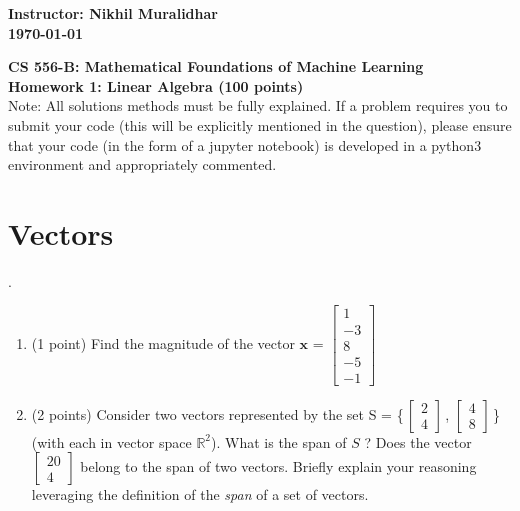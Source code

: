 \documentclass{article}%
\begin{document}
\begin{flushleft}
\textbf{Instructor: Nikhil Muralidhar \\
\today}
\end{flushleft}

\begin{center}
\textbf{\Large CS 556-B: Mathematical Foundations of Machine Learning \\
Homework 1: Linear Algebra (100 points)} \\
\vspace{2ex}
Note: All solutions methods must be fully explained. If a problem requires you to submit your code (this will be explicitly mentioned in the question), please ensure that your code (in the form of a jupyter notebook) is developed in a python3 environment and appropriately commented.
\end{center}

\section*{Vectors}.
\begin{enumerate}
    \item (1 point) Find the magnitude of the vector $\mathbf{x}$ = $\begin{bmatrix} 
    1 \\ -3 \\ 8 \\ -5 \\ -1  \end{bmatrix}$\vspace{2ex}\\

    \vspace{2ex}

    
    \item (2 points) Consider two vectors represented by the set 
    S = \bigg\{$\,\begin{bmatrix} 2\\ 4 \end{bmatrix}$\,, $\begin{bmatrix} 4\\ 8 \end{bmatrix}\,$\bigg\} (with each in vector space $\mathbb{R}^2$). What is the span of $S$ ? Does the vector $\begin{bmatrix} 20\\ 4 \end{bmatrix}$ belong to the span of two vectors. Briefly explain your reasoning leveraging the definition of the \emph{span} of a set of vectors. \vspace{2ex}\\

\end{enumerate}
\end{document}
